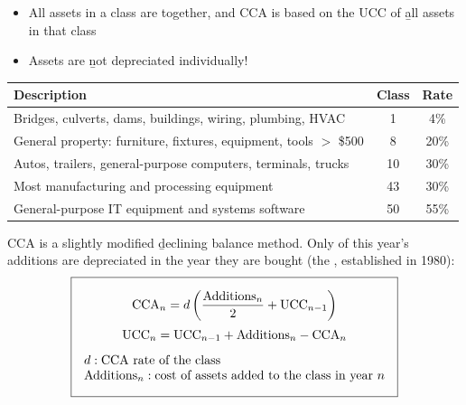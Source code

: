 \begin{itemize}
    \item All assets in a class are  together, and CCA is based on the UCC of \b{all} assets in that class
    \item Assets are \b{not} depreciated individually!
\end{itemize}
\begin{center}
\begin{tabular}{lcc}
    \toprule
    Description & Class & Rate \\
    \midrule
    Bridges, culverts, dams, buildings, wiring, plumbing, HVAC & 1 & 4\% \\
    General property: furniture, fixtures, equipment, tools $>$ \$500 & 8 & 20\% \\
    Autos, trailers, general-purpose computers, terminals, trucks & 10 & 30\% \\
    Most manufacturing and processing equipment & 43 & 30\% \\
    General-purpose IT equipment and systems software & 50 & 55\% \\
    \bottomrule
\end{tabular}
\end{center}

CCA is a slightly modified \b{declining balance} method. Only  of
this year's additions are depreciated in the year they are bought (the
, established in 1980):
\[\boxed{\begin{gathered}
    \text{CCA}_n = d\left(\frac{\text{Additions}_n}{2} + \text{UCC}_{n-1}\right)\\[2pt]
    \text{UCC}_n = \text{UCC}_{n-1} + \text{Additions}_n - \text{CCA}_n\\[4pt]
    \begin{array}{@{}l@{}}
        d: \text{CCA rate of the class}\\
        \text{Additions}_n: \text{cost of assets added to the class in year } n
    \end{array}
\end{gathered}}\]

